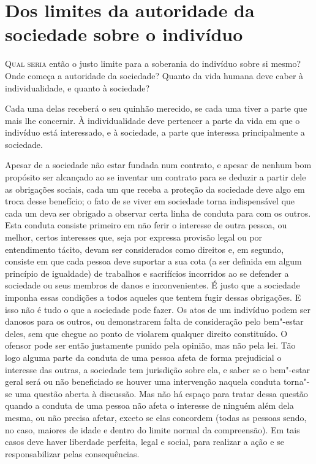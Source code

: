 \chapter[Dos limites da autoridade]{Dos limites da autoridade da sociedade sobre o indivíduo}

\textsc{Qual seria} então o justo limite para a soberania do indivíduo sobre si
mesmo? Onde começa a autoridade da sociedade? Quanto da vida humana
deve caber à individualidade, e quanto à sociedade?

Cada uma delas receberá o seu quinhão merecido, se cada uma tiver a parte
que mais lhe concernir. À individualidade deve pertencer a parte
da vida em que o indivíduo está interessado, e à sociedade,
a parte que interessa principalmente a sociedade.

Apesar de a sociedade não estar fundada num contrato, e apesar de nenhum
bom propósito ser alcançado ao se inventar um contrato para se deduzir
a partir dele as obrigações sociais, cada um que receba a proteção da
sociedade deve algo em troca desse benefício; o fato de se viver
em sociedade torna indispensável que cada um deva ser obrigado a
observar certa linha de conduta para com os outros. Esta conduta
consiste primeiro em não ferir o interesse de outra pessoa, ou melhor,
certos interesses que, seja por expressa provisão legal ou por
entendimento tácito, devam ser considerados como direitos e, em
segundo, consiste em que cada pessoa deve suportar a sua cota (a ser
definida em algum princípio de igualdade) de trabalhos e sacrifícios
incorridos ao se defender a sociedade ou seus membros de danos e
inconvenientes. É justo que a sociedade imponha essas condições a todos
aqueles que tentem fugir dessas obrigações. E isso não é tudo o que a
sociedade pode fazer. Os atos de um indivíduo podem ser danosos para os
outros, ou demonstrarem falta de consideração pelo bem"-estar deles, sem
que chegue ao ponto de violarem qualquer direito constituído. O ofensor
pode ser então justamente punido pela opinião, mas não pela lei. Tão
logo alguma parte da conduta de uma pessoa afeta de forma prejudicial o
interesse das outras, a sociedade tem jurisdição sobre ela, e saber
se o bem"-estar geral será ou não beneficiado se houver uma intervenção
naquela conduta torna"-se uma questão aberta à discussão. Mas não há espaço para
tratar dessa questão quando a conduta de uma pessoa não afeta o
interesse de ninguém além dela mesma, ou não precisa afetar,
exceto se elas concordem (todas as pessoas sendo, no caso, maiores de
idade e dentro do limite normal da compreensão). Em tais casos deve
haver liberdade perfeita, legal e social, para realizar a ação e se
responsabilizar pelas consequências.

